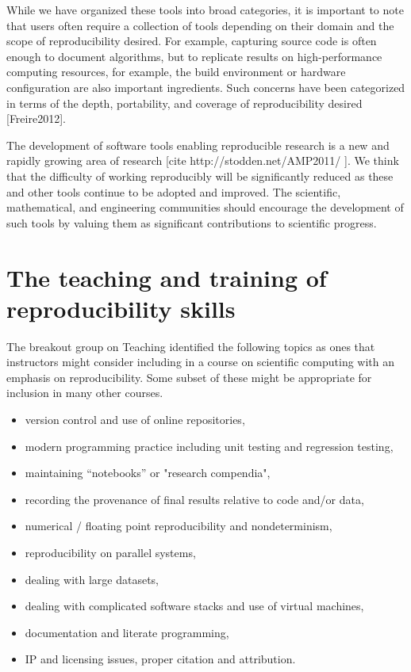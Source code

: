 \documentclass[11pt]{article}
\begin{document}
While we have organized these tools into broad categories, it is important to
note that users often require a collection of tools depending on their
domain and the scope of reproducibility desired.  For example, capturing
source code is often enough to document algorithms, but to
replicate results on high-performance computing resources, for example, the
build environment or hardware configuration are also important ingredients.  
Such concerns have been categorized in terms of
the depth, portability, and coverage of reproducibility desired [Freire2012].

The development of software tools enabling reproducible research is a new
and rapidly growing area of research [cite http://stodden.net/AMP2011/ ]. We
think that the difficulty of working reproducibly will be significantly
reduced as these and other tools continue to be adopted and improved.  The
scientific, mathematical, and engineering communities should encourage the
development of such tools by valuing them as significant contributions to
scientific progress.

\section{The teaching and training of reproducibility skills}
\label{sec:teaching2}
The breakout group on Teaching identified the following topics as ones that
instructors might consider including in a course on scientific computing
with an emphasis on reproducibility.  Some subset of these might be
appropriate for inclusion in many other courses.

\begin{itemize} 
\item version control and use of online repositories,
\item modern programming practice including unit testing and regression testing,
\item maintaining “notebooks” or "research compendia",
\item recording the provenance of final results relative to code and/or data,
\item numerical / floating point reproducibility and nondeterminism,
\item reproducibility on parallel systems,
\item dealing with large datasets,
\item dealing with complicated software stacks and use of virtual machines,
\item documentation and literate programming,
\item IP and licensing issues, proper citation and attribution.
\end{itemize} 
\end{document}
